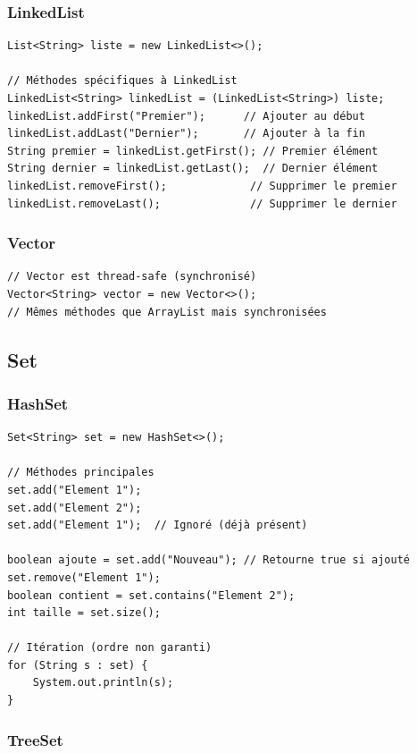 \documentclass[11pt,a4paper]{article}
\begin{document}
\subsubsection{LinkedList}

\begin{lstlisting}
List<String> liste = new LinkedList<>();

// Méthodes spécifiques à LinkedList
LinkedList<String> linkedList = (LinkedList<String>) liste;
linkedList.addFirst("Premier");      // Ajouter au début
linkedList.addLast("Dernier");       // Ajouter à la fin
String premier = linkedList.getFirst(); // Premier élément
String dernier = linkedList.getLast();  // Dernier élément
linkedList.removeFirst();             // Supprimer le premier
linkedList.removeLast();              // Supprimer le dernier
\end{lstlisting}

\subsubsection{Vector}

\begin{lstlisting}
// Vector est thread-safe (synchronisé)
Vector<String> vector = new Vector<>();
// Mêmes méthodes que ArrayList mais synchronisées
\end{lstlisting}

\subsection{Set}

\subsubsection{HashSet}

\begin{lstlisting}
Set<String> set = new HashSet<>();

// Méthodes principales
set.add("Element 1");
set.add("Element 2");
set.add("Element 1");  // Ignoré (déjà présent)

boolean ajoute = set.add("Nouveau"); // Retourne true si ajouté
set.remove("Element 1");
boolean contient = set.contains("Element 2");
int taille = set.size();

// Itération (ordre non garanti)
for (String s : set) {
    System.out.println(s);
}
\end{lstlisting}

\subsubsection{TreeSet}
\end{document}
